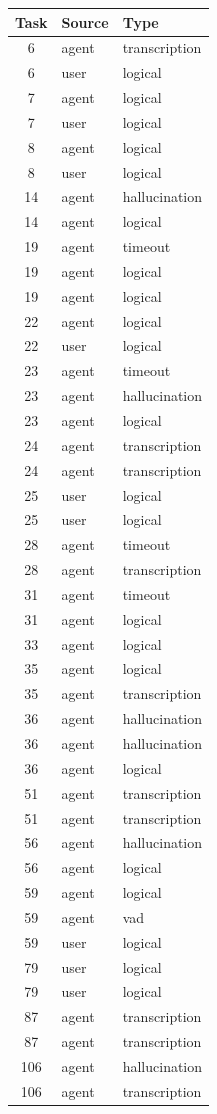 \begin{tabular}{cll}
\toprule
\textbf{Task} & \textbf{Source} & \textbf{Type} \\
\midrule
6 & agent & transcription \\
6 & user & logical \\
7 & agent & logical \\
7 & user & logical \\
8 & agent & logical \\
8 & user & logical \\
14 & agent & hallucination \\
14 & agent & logical \\
19 & agent & timeout \\
19 & agent & logical \\
19 & agent & logical \\
22 & agent & logical \\
22 & user & logical \\
23 & agent & timeout \\
23 & agent & hallucination \\
23 & agent & logical \\
24 & agent & transcription \\
24 & agent & transcription \\
25 & user & logical \\
25 & user & logical \\
28 & agent & timeout \\
28 & agent & transcription \\
31 & agent & timeout \\
31 & agent & logical \\
33 & agent & logical \\
35 & agent & logical \\
35 & agent & transcription \\
36 & agent & hallucination \\
36 & agent & hallucination \\
36 & agent & logical \\
51 & agent & transcription \\
51 & agent & transcription \\
56 & agent & hallucination \\
56 & agent & logical \\
59 & agent & logical \\
59 & agent & vad \\
59 & user & logical \\
79 & user & logical \\
79 & user & logical \\
87 & agent & transcription \\
87 & agent & transcription \\
106 & agent & hallucination \\
106 & agent & transcription \\
\bottomrule
\end{tabular}